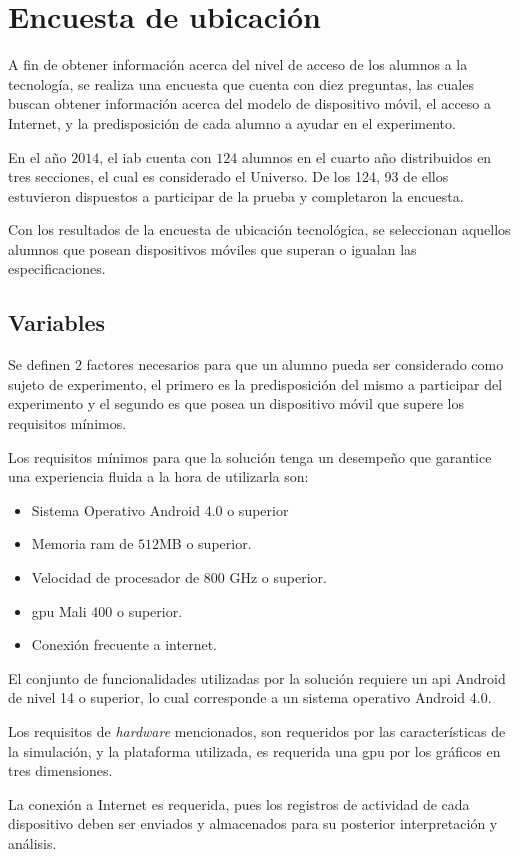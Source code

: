 
\section{Encuesta de ubicación}
\label{sec:ubicacion}


A fin de obtener información acerca del nivel de acceso  de los alumnos a la
tecnología, se realiza una encuesta que cuenta con diez preguntas, las cuales
buscan obtener información acerca del modelo de dispositivo móvil, el acceso a
Internet, y la predisposición de cada alumno a ayudar en el experimento.

En el año $2014$, el \Gls{iab} cuenta con $124$ alumnos en el cuarto año distribuidos en
tres secciones, el cual es considerado el Universo. De los 124, 93 de
ellos estuvieron dispuestos a participar de la prueba y completaron la encuesta.

Con los resultados de la encuesta de ubicación tecnológica, se seleccionan
aquellos alumnos que posean dispositivos móviles que superan o igualan las
especificaciones.


\subsection{Variables}

Se definen $2$ factores necesarios para que un alumno pueda ser considerado como
sujeto de experimento, el primero es la
predisposición del mismo a participar del experimento y el segundo es que posea
un dispositivo móvil que supere los requisitos mínimos.

Los requisitos mínimos para que la solución tenga un desempeño que garantice una
experiencia fluida a la hora de utilizarla son:

\begin{itemize}
    \item Sistema Operativo Android $4.0$ o superior
    \item Memoria ram de $512$MB o superior.
    \item Velocidad de procesador de $800$ GHz o superior.
    \item \Gls{gpu} Mali 400 o superior.
    \item Conexión frecuente a internet.
\end{itemize}

El conjunto de funcionalidades utilizadas por la solución requiere un \Gls{api}
Android de nivel 14\cite{android:api} o superior, lo cual corresponde a un
sistema operativo Android 4.0.

Los requisitos de \textit{hardware} mencionados, son requeridos por las
características de la simulación, y la plataforma utilizada, es requerida una
\Gls{gpu} por los gráficos en tres dimensiones.

La conexión a Internet es requerida, pues los registros de actividad de cada
dispositivo deben ser enviados y almacenados para su posterior interpretación y
análisis.
